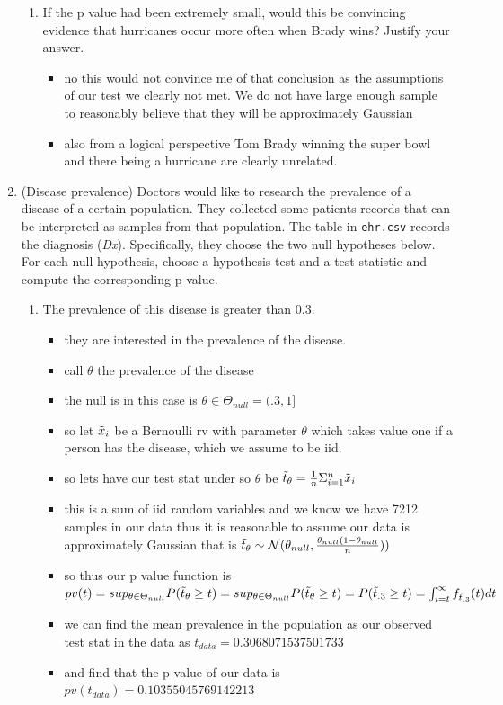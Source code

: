 \documentclass[12pt,twoside]{article}
\begin{document}
\begin{enumerate}
\begin{enumerate}
\item If the p value had been extremely small, would this be convincing evidence that hurricanes occur more often when Brady wins? Justify your answer.
\begin{itemize}
    \color{blue}
    \item no this would not convince me of that conclusion as the assumptions of our test we clearly not met. We do not have large enough sample to reasonably believe that they will be approximately Gaussian 
    \item also from a logical perspective Tom Brady winning the super bowl and there being a hurricane are clearly unrelated. 
\end{itemize}
\end{enumerate}
\newpage





\item (Disease prevalence)
Doctors would like to research the prevalence of a disease of a certain population. They collected some patients records that can be interpreted as samples from that population. The table in \texttt{ehr.csv} records the diagnosis (\textit{Dx}). Specifically, they choose the two null hypotheses below. For each null hypothesis, choose a hypothesis test and a test statistic and compute the corresponding p-value. 
\begin{enumerate}
\item The prevalence of this disease is greater than 0.3.
\begin{itemize}
    \color{blue}
    \item they are interested in the prevalence of the disease.
    \item call $\theta$ the prevalence of the disease 
    \item the null is in this case is $\theta\in \Theta_{null}=(.3,1]$
    \item so let $\Tilde{x}_i$ be a Bernoulli rv with parameter $\theta$ which takes value one if a person has the disease, which we assume to be iid. 
    \item so lets have our test stat under so $\theta$ be $\Tilde{t}_{\theta}=\frac{1}{n}\Sigma_{i=1}^{n}\Tilde{x}_i$
    \item this is a sum of iid random variables and we know we have 7212 samples in our data thus it is reasonable to assume our data is approximately Gaussian that is $\Tilde{t}_{\theta}\sim \mathcal{N}(\theta_{null}, \frac{\theta_{null}(1-\theta_{null}}{n}))$
    \item so thus our p value function is $pv(t)=sup_{\theta\in \Theta_{null}}P(\Tilde{t}_{\theta}\geq t)=sup_{\theta\in \Theta_{null}}P(\Tilde{t}_{\theta}\geq t)=P(\Tilde{t}_{.3}\geq t)=\int_{i=t}^{\infty}f_{\Tilde{t}_{.3}}(t)dt$ 
    \item we can find the mean prevalence in the population as our observed test stat in the data as $t_{data}=0.3068071537501733$
    \item and find that the p-value of our data is $pv(t_{data})=0.10355045769142213$
\end{itemize}



\end{enumerate}
\end{enumerate}
\end{document}
